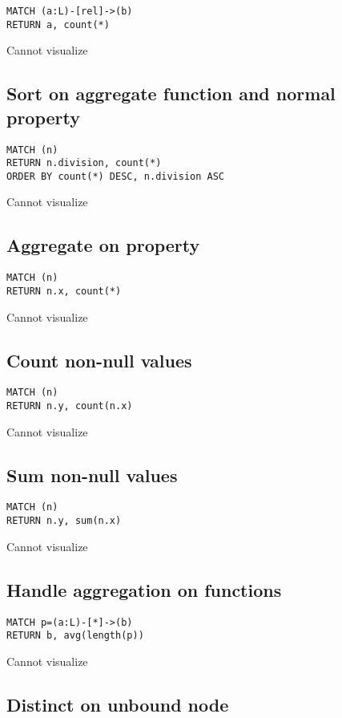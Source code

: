 \begin{lstlisting}
MATCH (a:L)-[rel]->(b)
RETURN a, count(*)
\end{lstlisting}

Cannot visualize
\subsection{Sort on aggregate function and normal property}

\begin{lstlisting}
MATCH (n)
RETURN n.division, count(*)
ORDER BY count(*) DESC, n.division ASC
\end{lstlisting}

Cannot visualize
\subsection{Aggregate on property}

\begin{lstlisting}
MATCH (n)
RETURN n.x, count(*)
\end{lstlisting}

Cannot visualize
\subsection{Count non-null values}

\begin{lstlisting}
MATCH (n)
RETURN n.y, count(n.x)
\end{lstlisting}

Cannot visualize
\subsection{Sum non-null values}

\begin{lstlisting}
MATCH (n)
RETURN n.y, sum(n.x)
\end{lstlisting}

Cannot visualize
\subsection{Handle aggregation on functions}

\begin{lstlisting}
MATCH p=(a:L)-[*]->(b)
RETURN b, avg(length(p))
\end{lstlisting}

Cannot visualize
\subsection{Distinct on unbound node}

